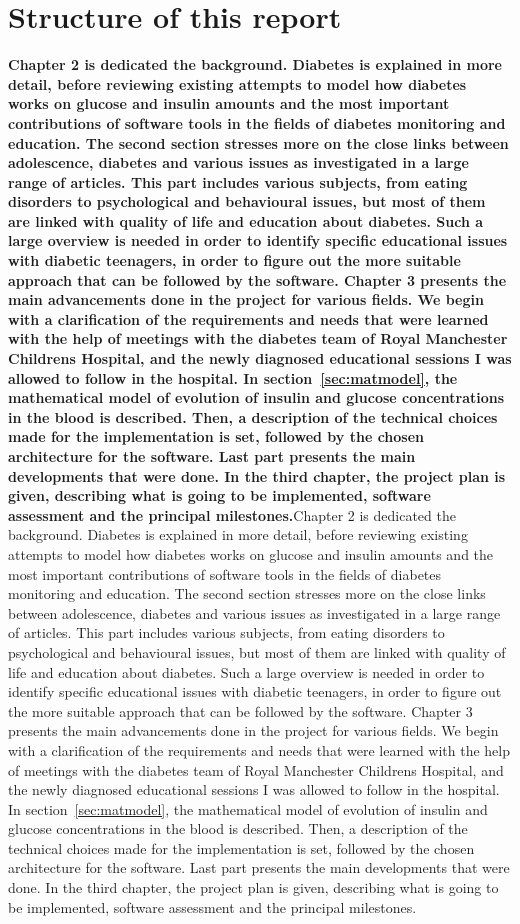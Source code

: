 \documentclass[12pt,MSc]{muthesis}
\newcommand{\warn}[1]{\ifdefined\debug\textbf{#1}\else#1\fi}
\begin{document}
\section{Structure of this report}

\warn{Chapter 2 is dedicated the background. Diabetes is explained in more detail, before reviewing existing attempts to model how diabetes works on glucose and insulin amounts and the most important contributions of software tools in the fields of diabetes monitoring and education. The second section stresses more on the close links between adolescence, diabetes and various issues as investigated in a large range of articles. This part includes various subjects, from eating disorders to psychological and behavioural issues, but most of them are linked with quality of life and education about diabetes. Such a large overview is needed in order to identify specific educational issues with diabetic teenagers, in order to figure out the more suitable approach that can be followed by the software. 
Chapter 3 presents the main advancements done in the project for various fields. We begin with a clarification of the requirements and needs that were learned with the help of meetings with the diabetes team of Royal Manchester Childrens Hospital, and the newly diagnosed educational sessions I was allowed to follow in the hospital. In section~\ref{sec:matmodel}, the mathematical model of evolution of insulin and glucose concentrations in the blood is described. Then, a description of the technical choices made for the implementation is set, followed by the chosen architecture for the software. Last part presents the main developments that were done.
In the third chapter, the project plan is given, describing what is going to be implemented, software assessment and the principal milestones.}







%



\end{document}
